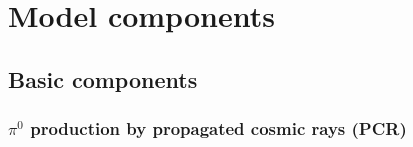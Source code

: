 \section{Model components}
\subsection{Basic components}


\subsubsection{$\pi^0$ production by propagated cosmic rays (PCR)}
%
%

